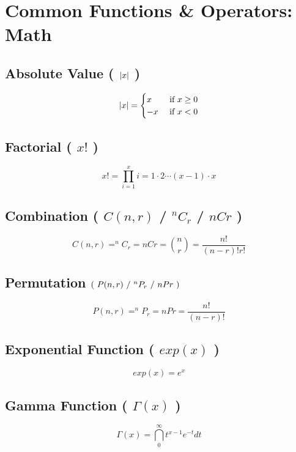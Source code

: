 \chapter{Common Functions \& Operators: Math}



\section{Absolute Value ( $\left| x \right|$ )}\label{abs_value}
\[
    \left|  x  \right| = \begin{cases}
       x & \text{ if } x \geq 0 \\
       -x & \text{ if } x < 0 
    \end{cases}
\]


\section{Factorial ( $x!$ )}\label{Factorial}
\[
    x! = \prod_{i=1}^{x} i = 1 \cdot 2 \cdots (x-1) \cdot x 
\]

\section{Combination ( $C(n,r)$ / $^nC_r$ / $nCr$ ) } \label{Combination}

\[
    C(n,r) = ^nC_r = nCr = \displaystyle\binom{n}{r} = \displaystyle\dfrac{n!}{(n-r)!r!}
\]

\section{Permutation \( \dParenBrac{\ P(n,r)\ /\ ^nP_r\ /\ nPr\ } \)} \label{Permutation}

\[
    P(n,r) = ^nP_r = nPr = \displaystyle\dfrac{n!}{(n-r)!}
\]

\section{Exponential Function ( $exp(x)$ )}\label{Exponential Function}

\[
    exp(x) = e^x
\]

\section{Gamma Function ( $\Gamma(x)$ )}\label{Gamma Function}

\[
    \Gamma(x) = \dint_{0}^{\infty} t^{x-1} e^{-t} dt
\]


